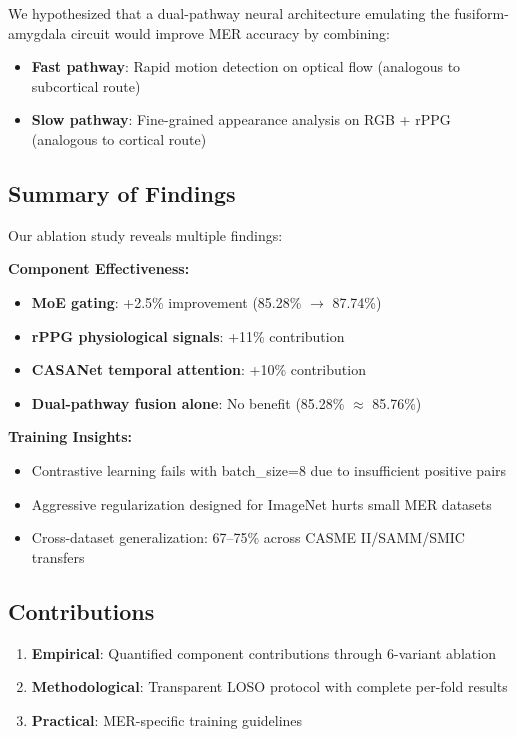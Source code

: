 \documentclass[preprint,12pt,authoryear]{elsarticle}
\begin{document}
We hypothesized that a dual-pathway neural architecture emulating the fusiform-amygdala circuit would improve MER accuracy by combining:
\begin{itemize}
\item \textbf{Fast pathway}: Rapid motion detection on optical flow (analogous to subcortical route)
\item \textbf{Slow pathway}: Fine-grained appearance analysis on RGB + rPPG (analogous to cortical route)
\end{itemize}

\subsection{Summary of Findings}

Our ablation study reveals multiple findings:

\textbf{Component Effectiveness:}
\begin{itemize}
\item \textbf{MoE gating}: +2.5\% improvement (85.28\% $\rightarrow$ 87.74\%)
\item \textbf{rPPG physiological signals}: +11\% contribution
\item \textbf{CASANet temporal attention}: +10\% contribution
\item \textbf{Dual-pathway fusion alone}: No benefit (85.28\% $\approx$ 85.76\%)
\end{itemize}

\textbf{Training Insights:}
\begin{itemize}
\item Contrastive learning fails with batch\_size=8 due to insufficient positive pairs
\item Aggressive regularization designed for ImageNet hurts small MER datasets
\item Cross-dataset generalization: 67--75\% across CASME II/SAMM/SMIC transfers
\end{itemize}

\subsection{Contributions}

\begin{enumerate}
\item \textbf{Empirical}: Quantified component contributions through 6-variant ablation
\item \textbf{Methodological}: Transparent LOSO protocol with complete per-fold results
\item \textbf{Practical}: MER-specific training guidelines
\end{enumerate}
\end{document}
